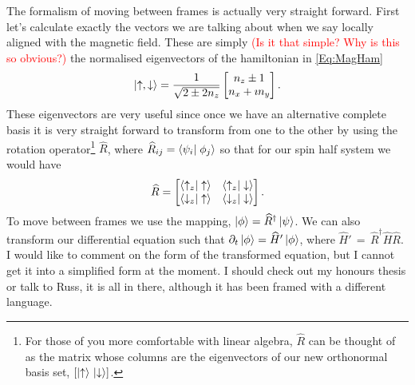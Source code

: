 The formalism of moving between frames is actually very straight forward.
First let's calculate exactly the vectors we are talking about when we say locally aligned with the magnetic field.
These are simply \textcolor{red}{(Is it that simple? Why is this so obvious?)} the normalised eigenvectors of the hamiltonian in \autoref{Eq:MagHam}
\begin{equation}
    \ket{\uparrow,\downarrow} = \frac{1}{\sqrt{2\pm 2n_z}} \begin{bmatrix} n_z \pm 1\\
                                                                           n_x + \imath n_y \end{bmatrix}.
\end{equation}
These eigenvectors are very useful since once we have an alternative complete basis it is very straight forward to transform from one to the other by using the rotation operator\footnote{For those of you more comfortable with linear algebra, $\widehat{R}$ can be thought of as the matrix whose columns are the eigenvectors of our new orthonormal basis set, \ie $\left[\ket{\uparrow}\, \ket{\downarrow}\right]$.} $\widehat{R}$, where $\widehat{R}_{ij} = \bra{\psi_i}\left.\phi_j\right>$ so that for our spin half system we would have
\begin{equation}
    \widehat{R} = \begin{bmatrix} \bra{\uparrow_z}\left.\uparrow\right>   & \bra{\uparrow_z}\left.\downarrow\right>\\
                              \bra{\downarrow_z}\left.\uparrow\right> & \bra{\downarrow_z}\left.\downarrow\right>
              \end{bmatrix}.
\end{equation}
To move between frames we use the mapping, $\ket{\phi} = \widehat{R}^{\dagger} \ket{\psi}$.
We can also transform our differential equation such that $\partial_t \ket{\phi} = \widehat{H}' \ket{\phi}$, where $\widehat{H}'\,=\,\widehat{R}^{\dagger} \widehat{H} \widehat{R}$.
I would like to comment on the form of the transformed equation, but I cannot get it into a simplified form at the moment. I should check out my honours thesis or talk to Russ, it is all in there, although it has been framed with a different language.

